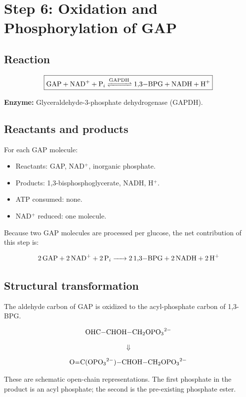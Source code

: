 \documentclass[11pt,a4paper]{article}
\newcommand{\Enz}[1]{\textbf{Enzyme:} #1}
\begin{document}
\section{Step 6: Oxidation and Phosphorylation of GAP}
\label{step:6}

\subsection{Reaction}

\[
\boxed{
\ce{
GAP + NAD+ + P_i
<=>[GAPDH]
1,3-BPG + NADH + H+
}
}
\]

\Enz{Glyceraldehyde-3-phosphate dehydrogenase (GAPDH).}

\subsection{Reactants and products}

For each GAP molecule:

\begin{itemize}
  \item Reactants: GAP, NAD$^+$, inorganic phosphate.
  \item Products: 1,3-bisphosphoglycerate, NADH, H$^+$.
  \item ATP consumed: none.
  \item NAD$^+$ reduced: one molecule.
\end{itemize}

Because two GAP molecules are processed per glucose, the net
contribution of this step is:

\[
\ce{
2 GAP + 2 NAD+ + 2 P_i
-> 2 1,3-BPG + 2 NADH + 2 H+
}
\]

\subsection{Structural transformation}

The aldehyde carbon of GAP is oxidized to the acyl-phosphate
carbon of 1,3-BPG.

\[
\ce{
OHC-CHOH-CH2OPO3^{2-}
}
\]

\[
\Downarrow
\]

\[
\ce{
O=C(OPO3^{2-})-CHOH-CH2OPO3^{2-}
}
\]

These are schematic open-chain representations. The first
phosphate in the product is an acyl phosphate; the second is
the pre-existing phosphate ester.
\end{document}
